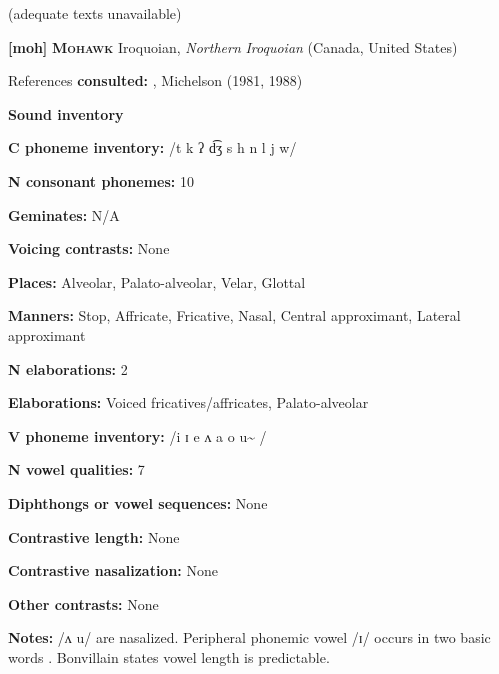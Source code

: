 (adequate texts unavailable)



\textbf{[moh]}   \textbf{\textsc{Mohawk}}  Iroquoian, \textit{Northern} \textit{Iroquoian} (Canada, United States)



References \textbf{consulted:} \citet{Bonvillain1973}, Michelson (1981, 1988)



\textbf{Sound inventory}



\textbf{C phoneme inventory:} /t k ʔ d͡ʒ s h n l j w/



\textbf{N consonant phonemes:} 10



\textbf{Geminates:} N/A



\textbf{Voicing contrasts:} None



\textbf{Places:} Alveolar, Palato-alveolar, Velar, Glottal



\textbf{Manners:} Stop, Affricate, Fricative, Nasal, Central approximant, Lateral approximant



\textbf{N elaborations:} 2



\textbf{Elaborations:} Voiced fricatives/affricates, Palato-alveolar



\textbf{V phoneme inventory:} /i ɪ e ʌ a o u\~{} /



\textbf{N vowel qualities:} 7



\textbf{Diphthongs or vowel sequences:} None



\textbf{Contrastive length:} None



\textbf{Contrastive nasalization:} None



\textbf{Other contrasts:} None



\textbf{Notes:} /ʌ u/ are nasalized. Peripheral phonemic vowel /ɪ/ occurs in two basic words \citep[43]{Bonvillain1973}. Bonvillain states vowel length is predictable.



